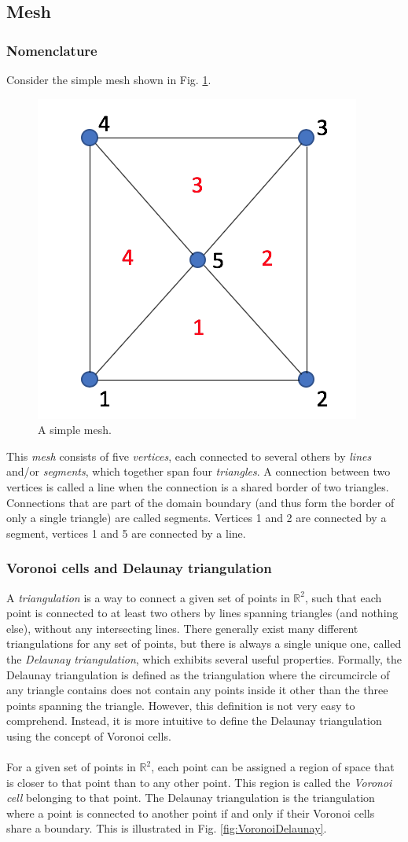 \documentclass{article}
\begin{document}
\subsection{Mesh}

\subsubsection{Nomenclature}

Consider the simple mesh shown in Fig. \ref{fig:dummymesh}.

\begin{figure}[h!] \label{fig:dummymesh}
  \includegraphics[width=0.3\linewidth]{Fig_dummymesh_02.png}
  \caption{A simple mesh.}
\end{figure}

This \emph{mesh} consists of five \emph{vertices}, each connected to several others by \emph{lines} and/or \emph{segments}, which together span four \emph{triangles}. A connection between two vertices is called a line when the connection is a shared border of two triangles. Connections that are part of the domain boundary (and thus form the border of only a single triangle) are called segments. Vertices 1 and 2 are connected by a segment, vertices 1 and 5 are connected by a line.

\subsubsection{Voronoi cells and Delaunay triangulation}

A \emph{triangulation} is a way to connect a given set of points in $\mathbb{R}^{2}$, such that each point is connected to at least two others by lines spanning triangles (and nothing else), without any intersecting lines. There generally exist many different triangulations for any set of points, but there is always a single unique one, called the \emph{Delaunay triangulation}, which exhibits several useful properties. Formally, the Delaunay triangulation is defined as the triangulation where the circumcircle of any triangle contains does not contain any points inside it other than the three points spanning the triangle. However, this definition is not very easy to comprehend. Instead, it is more intuitive to define the Delaunay triangulation using the concept of Voronoi cells.\\
\\
For a given set of points in $\mathbb{R}^{2}$, each point can be assigned a region of space that is closer to that point than to any other point. This region is called the \emph{Voronoi cell} belonging to that point. The Delaunay triangulation is the triangulation where a point is connected to another point if and only if their Voronoi cells share a boundary. This is illustrated in Fig. \ref{fig:VoronoiDelaunay}.
\end{document}

